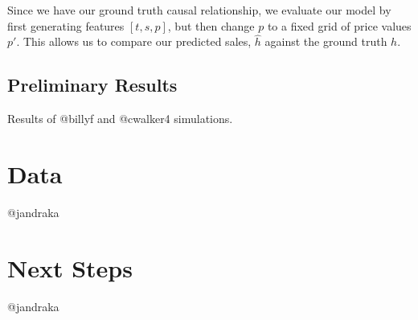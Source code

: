 \documentclass[11pt, oneside, twocolumn]{article}   	%
\begin{document}
Since we have our ground truth causal relationship, we evaluate our model by first generating features $[t, s, p]$, but then change $p$ to a fixed grid of price values $p'$. This allows us to compare our predicted sales, $\hat{h}$ against the ground truth $h$. 

\subsection{Preliminary Results} 
Results of @billyf and @cwalker4 simulations.

\section{Data}
@jandraka

\section{Next Steps}
@jandraka 
\end{document}
